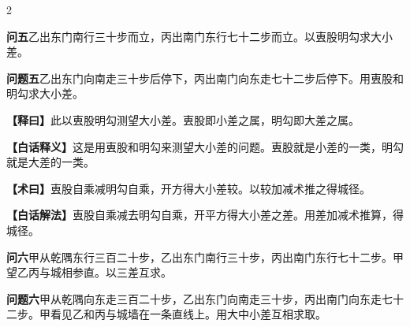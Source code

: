 \documentclass[11pt,a4paper]{article}
\newcommand{\WenQuestion}[1]{\textbf{\textcolor{classicalcolor}{#1}}}
\newcommand{\BaiQuestion}[1]{\textbf{\textcolor{moderncolor}{#1}}}
\newcommand{\WenExplain}{\textcolor{classicalcolor}{\textbf{【释曰】}}}
\newcommand{\BaiExplain}{\textcolor{moderncolor}{\textbf{【白话释义】}}}
\newcommand{\WenMethod}{\textcolor{classicalcolor}{\textbf{【术曰】}}}
\newcommand{\BaiMethod}{\textcolor{moderncolor}{\textbf{【白话解法】}}}
\begin{document}
\begin{paracol}{2}
\vspace{0.8em}

\switchcolumn*
\begin{tcolorbox}[colback=red!3,colframe=red!30!black,boxrule=0.3pt]
\WenQuestion{问五}\quad 乙出东门南行三十步而立，丙出南门东行七十二步而立。以叀股明勾求大小差。
\end{tcolorbox}
\switchcolumn
\begin{tcolorbox}[colback=blue!3,colframe=blue!30!black,boxrule=0.3pt]
\BaiQuestion{问题五}\quad 乙出东门向南走三十步后停下，丙出南门向东走七十二步后停下。用叀股和明勾求大小差。
\end{tcolorbox}

\switchcolumn*
\begin{tcolorbox}[colback=red!5,colframe=red!30!black,boxrule=0.3pt]
\WenExplain\quad 此以叀股明勾测望大小差。叀股即小差之属，明勾即大差之属。
\end{tcolorbox}
\switchcolumn
\begin{tcolorbox}[colback=blue!5,colframe=blue!30!black,boxrule=0.3pt]
\BaiExplain\quad 这是用叀股和明勾来测望大小差的问题。叀股就是小差的一类，明勾就是大差的一类。
\end{tcolorbox}

\switchcolumn*
\begin{tcolorbox}[colback=red!5,colframe=red!40!black,boxrule=0.3pt]
\WenMethod\quad 叀股自乘减明勾自乘，开方得大小差较。以较加减术推之得城径。
\end{tcolorbox}
\switchcolumn
\begin{tcolorbox}[colback=blue!5,colframe=blue!40!black,boxrule=0.3pt]
\BaiMethod\quad 叀股自乘减去明勾自乘，开平方得大小差之差。用差加减术推算，得城径。
\end{tcolorbox}

\vspace{0.8em}

\switchcolumn*
\begin{tcolorbox}[colback=red!3,colframe=red!30!black,boxrule=0.3pt]
\WenQuestion{问六}\quad 甲从乾隅东行三百二十步，乙出东门南行三十步，丙出南门东行七十二步。甲望乙丙与城相参直。以三差互求。
\end{tcolorbox}
\switchcolumn
\begin{tcolorbox}[colback=blue!3,colframe=blue!30!black,boxrule=0.3pt]
\BaiQuestion{问题六}\quad 甲从乾隅向东走三百二十步，乙出东门向南走三十步，丙出南门向东走七十二步。甲看见乙和丙与城墙在一条直线上。用大中小差互相求取。
\end{tcolorbox}


\end{paracol}
\end{document}
